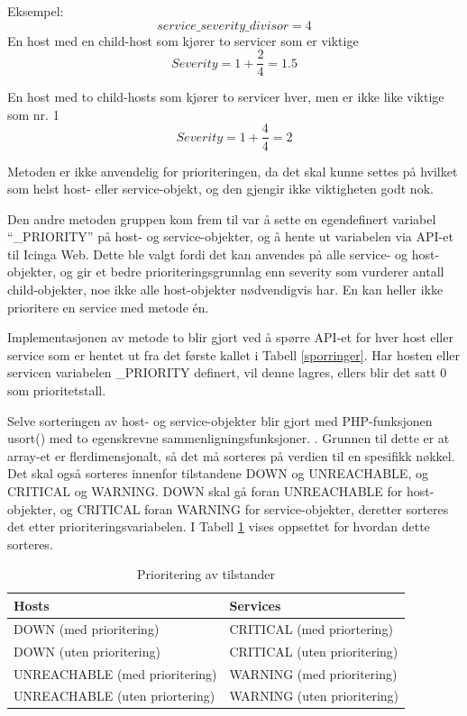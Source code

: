Eksempel:
\begin{equation}
service\_severity\_divisor = 4 
\end{equation}
En host med en child-host som kjører to servicer som er viktige
\begin{equation}
Severity = 1 + \frac{2}{4} = 1.5
\end{equation}

En host med to child-hosts som kjører to servicer hver, men er ikke like viktige som nr. 1
\begin{equation}
Severity = 1 + \frac{4}{4} = 2
\end{equation}

Metoden er ikke anvendelig for prioriteringen, da det skal kunne settes på hvilket som helst host- eller service-objekt, og den gjengir ikke viktigheten godt nok.     

Den andre metoden gruppen kom frem til var å sette en egendefinert variabel ``\_PRIORITY'' på host- og service-objekter, og å hente ut variabelen via API-et til Icinga Web. Dette ble valgt fordi det kan anvendes på alle service- og host-objekter, og gir et bedre prioriteringsgrunnlag enn severity som vurderer antall child-objekter, noe ikke alle host-objekter nødvendigvis har. En kan heller ikke prioritere en service med metode én.

Implementasjonen av metode to blir gjort ved å spørre API-et for hver host eller service som er hentet ut fra det første kallet i Tabell \ref{sporringer}. Har hosten eller servicen variabelen \_PRIORITY definert, vil denne lagres, ellers blir det satt 0 som prioritetstall.

Selve sorteringen av host- og service-objekter blir gjort med PHP-funksjonen usort() med to egenskrevne sammenligningsfunksjoner. \cite{usort}. Grunnen til dette er at array-et er flerdimensjonalt, så det må sorteres på verdien til en spesifikk nøkkel. Det skal også sorteres innenfor tilstandene DOWN og UNREACHABLE, og CRITICAL og WARNING. DOWN skal gå foran UNREACHABLE for host-objekter, og CRITICAL foran WARNING for service-objekter, deretter sorteres det etter prioriteringsvariabelen. I Tabell \ref{prioritering} vises oppsettet for hvordan dette sorteres.

\begin{table}
\begin{center}
\begin{tabular}{ | l | l |} \hline
    \textbf{Hosts} & \textbf{Services} \\ \hline
    DOWN (med prioritering) & CRITICAL (med priortering) \\ \hline
    DOWN (uten prioritering) & CRITICAL (uten prioritering) \\ \hline
    UNREACHABLE (med prioritering) & WARNING (med prioritering) \\ \hline
    UNREACHABLE (uten priortering) & WARNING (uten prioritering) \\ \hline
\end{tabular}
\caption{Prioritering av tilstander}
\label{prioritering}
\end{center}
\end{table}
